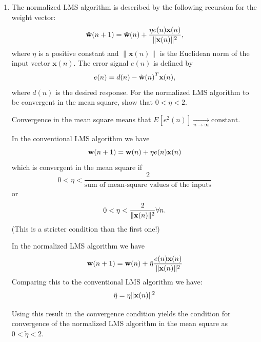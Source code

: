 \begin{enumerate}
\item The normalized LMS algorithm is described by the following
  recursion for the weight vector:
  \begin{equation*}
    \Hat{\mathbf{w}}(n+1)= \Hat{\mathbf{w}}(n) +\frac{\eta e(n)
      \mathbf{x}(n)} {\| \mathbf{x}(n) \|^2},
  \end{equation*}
  where $\eta$ is a positive constant and $\|\mathbf{x}(n) \|$ is the
  Euclidean norm of the input vector $\mathbf{x}(n)$. The error
  signal $e(n)$ is defined by
  \begin{equation*}
    e(n)=d(n)-{\Hat{\mathbf{w}}(n)}^T \mathbf{x}(n),
  \end{equation*}
  where $d(n)$ is the desired response. For the normalized LMS algorithm to
  be convergent in the mean square, show that $0< \eta <2$.

  \begin{solution}

    Convergence in the mean square means that
    $E\left[e^2(n)\right]\xrightarrow[n\rightarrow\infty]{}\mbox{constant}$.

    In the conventional LMS algorithm we have
    \begin{equation*}
      {\bf{w}}(n+1)={\bf{w}}(n)+\eta e(n){\bf{x}}(n)
    \end{equation*}
    which is convergent in the mean
    square if 
    \begin{equation*}
      0<\eta<\frac{2}{\mbox{sum of mean-square values of the
          inputs}}\end{equation*}
    or 
    \begin{equation*}
      0<\eta<\frac{2}{\|{\bf{x}}(n)\|^2} \forall n.
    \end{equation*}
    (This is a stricter condition than the first one!)



    In the normalized LMS algorithm we have
    \begin{equation*}
      {\bf{w}}(n+1)={\bf{w}}(n)+\tilde{\eta}\frac{e(n){\bf{x}}(n)}{\|{\bf{x}}(n)\|^2}
    \end{equation*}
    Comparing this to the conventional LMS algorithm we have:
    \begin{equation*}
      \tilde{\eta}=\eta\|{\bf{x}}(n)\|^2
    \end{equation*}

    Using this result in the convergence condition yields the condition
    for convergence of the normalized LMS algorithm in the mean square as
    $0<\tilde{\eta}<2$.


\end{solution}
\end{enumerate}
